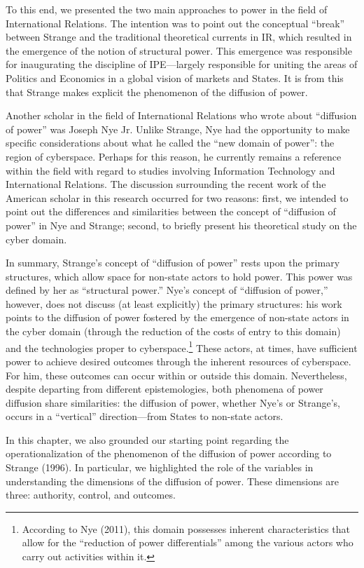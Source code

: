 To this end, we presented the two main approaches to power in the field of International Relations. The intention was to point out the conceptual ``break'' between Strange and the traditional theoretical currents in IR, which resulted in the emergence of the notion of structural power. This emergence was responsible for inaugurating the discipline of IPE---largely responsible for uniting the areas of Politics and Economics in a global vision of markets and States. It is from this that Strange makes explicit the phenomenon of the diffusion of power.

Another scholar in the field of International Relations who wrote about ``diffusion of power'' was Joseph Nye Jr. Unlike Strange, Nye had the opportunity to make specific considerations about what he called the ``new domain of power'': the region of cyberspace. Perhaps for this reason, he currently remains a reference within the field with regard to studies involving Information Technology and International Relations. The discussion surrounding the recent work of the American scholar in this research occurred for two reasons: first, we intended to point out the differences and similarities between the concept of ``diffusion of power'' in Nye and Strange; second, to briefly present his theoretical study on the cyber domain.

In summary, Strange's concept of ``diffusion of power'' rests upon the primary structures, which allow space for non-state actors to hold power. This power was defined by her as ``structural power.'' Nye's concept of ``diffusion of power,'' however, does not discuss (at least explicitly) the primary structures: his work points to the diffusion of power fostered by the emergence of non-state actors in the cyber domain (through the reduction of the costs of entry to this domain) and the technologies proper to cyberspace.\footnote{According to Nye (2011), this domain possesses inherent characteristics that allow for the ``reduction of power differentials'' among the various actors who carry out activities within it.} These actors, at times, have sufficient power to achieve desired outcomes through the inherent resources of cyberspace. For him, these outcomes can occur within or outside this domain. Nevertheless, despite departing from different epistemologies, both phenomena of power diffusion share similarities: the diffusion of power, whether Nye's or Strange's, occurs in a ``vertical'' direction---from States to non-state actors.

In this chapter, we also grounded our starting point regarding the operationalization of the phenomenon of the diffusion of power according to Strange (1996). In particular, we highlighted the role of the variables in understanding the dimensions of the diffusion of power. These dimensions are three: authority, control, and outcomes.

